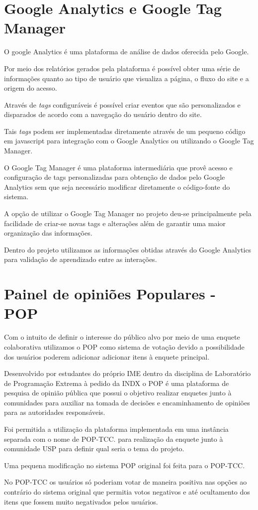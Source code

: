 \section{Google Analytics e Google Tag Manager}
\par O google Analytics é uma plataforma de análise de dados oferecida pelo Google.
\par Por meio dos relatórios gerados pela plataforma é possível obter uma série de informações quanto ao tipo de usuário que visualiza a página, o fluxo do site e a origem do acesso.
\par Através de \emph{tags} configuráveis é possível criar eventos que são personalizados e disparados de acordo com a navegação do usuário dentro do site.
\par Tais \emph{tags} podem ser implementadas diretamente através de um pequeno código em javascript para integração com o Google Analytics ou utilizando o Google Tag Manager.
\par O Google Tag Manager é uma plataforma intermediária que provê acesso e configuração de tags personalizadas para obtenção de dados pelo Google Analytics sem que seja necessário modificar diretamente o código-fonte do sistema.
\par A opção de utilizar o Google Tag Manager no projeto deu-se principalmente pela facilidade de criar-se novas tags e alterações além de garantir uma maior organização das informações.
\par Dentro do projeto utilizamos as informações obtidas através do Google Analytics para validação de aprendizado entre as interações.

\section{Painel de opiniões Populares - POP}
\par Com o intuito de definir o interesse do público alvo por meio de uma enquete colaborativa utilizamos o POP como sistema de votação devido a possibilidade dos usuários poderem adicionar adicionar itens à enquete principal.
\par Desenvolvido por estudantes do próprio IME dentro da disciplina de Laboratório de Programação Extrema à pedido da INDX o POP é uma plataforma de pesquisa de opinião pública que possui o objetivo realizar enquetes junto à comunidades para auxiliar na tomada de decisões e encaminhamento de opiniões para as autoridades responsáveis.
\par Foi permitida a utilização da plataforma implementada em uma instância separada com o nome de POP-TCC. para realização da enquete junto à comunidade USP para definir qual seria o tema do projeto.
\par Uma pequena modificação no sistema POP original foi feita para o POP-TCC.
\par No POP-TCC os usuários só poderiam votar de maneira positiva nas opções ao contrário do sistema original que permitia votos negativos e até ocultamento dos itens que fossem muito negativados pelos usuários.

